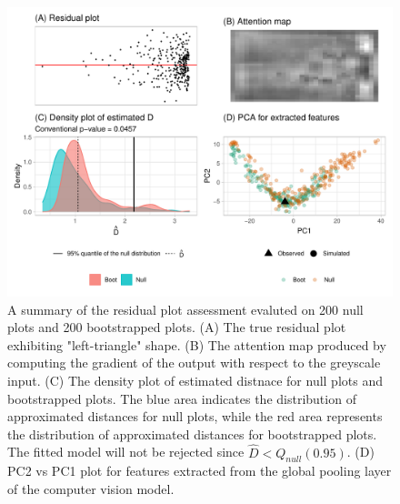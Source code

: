 \documentclass[]{interact}
\theoremstyle{plain}%
\theoremstyle{definition}
\theoremstyle{remark}
\begin{document}
\begin{figure}[!h]

{\centering \includegraphics[width=1\linewidth]{paper_files/figure-latex/false-check-1} 

}

\caption{A summary of the residual plot assessment evaluted on 200 null plots and 200 bootstrapped plots. (A) The true residual plot exhibiting "left-triangle" shape. (B) The attention map produced by computing the gradient of the output with respect to the greyscale input.  (C) The density plot of estimated distnace for null plots and bootstrapped plots. The blue area indicates the distribution of approximated distances for null plots, while the red area represents the distribution of approximated distances for bootstrapped plots. The fitted model will not be rejected since $\hat{D} < Q_{null}(0.95)$. (D) PC2 vs PC1 plot for features extracted from the global pooling layer of the computer vision model.  }\label{fig:false-check}
\end{figure}
\end{document}
